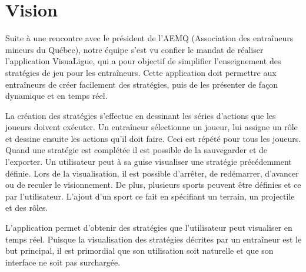 
\chapter{Vision}
\label{s:vision}

Suite à une rencontre avec le président de l'AEMQ (Association des entraîneurs mineurs du Québec), notre équipe s'est vu confier le mandat de réaliser l'application VisuaLigue, qui a pour objectif de simplifier l'enseignement des stratégies de jeu pour les entraîneurs.
Cette application doit permettre aux entraîneurs de créer facilement des stratégies, puis de les présenter de façon dynamique et en temps réel.

La cr\'eation des strat\'egies s'effectue en dessinant les s\'eries d'actions que les joueurs doivent ex\'ecuter.
Un entra\^ineur s\'electionne un joueur, lui assigne un r\^ole et dessine ensuite les actions qu'il doit faire.
Ceci est r\'ep\'et\'e pour tous les joueurs.
Quand une strat\'egie est compl\'et\'ee il est possible de la sauvegarder et de l'exporter.
Un utilisateur peut \`a sa guise visualiser une strat\'egie pr\'ec\'edemment d\'efinie.
Lors de la visualisation, il est possible d'arr\^eter, de red\'emarrer, d'avancer ou de reculer le visionnement.
De plus, plusieurs sports peuvent \^etre d\'efinies et ce par l'utilisateur.
L'ajout d'un sport ce fait en sp\'ecifiant un terrain, un projectile et des r\^oles.

L'application permet d'obtenir des strat\'egies que l'utilisateur peut visualiser en temps r\'eel.
Puisque la visualisation des stratégies décrites par un entraîneur est le but principal, il est primordial que son utilisation soit naturelle et que son interface ne soit pas surchargée.
